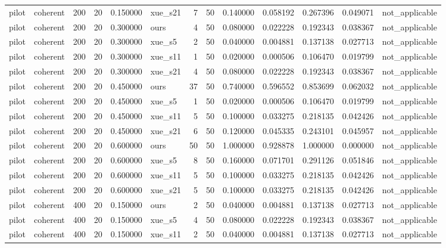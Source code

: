 \begin{longtable}{llrrrlrrrrrrl}
pilot & coherent & 200 & 20 & 0.150000 & xue\_s21 & 7 & 50 & 0.140000 & 0.058192 & 0.267396 & 0.049071 & not\_applicable \\
pilot & coherent & 200 & 20 & 0.300000 & ours & 4 & 50 & 0.080000 & 0.022228 & 0.192343 & 0.038367 & not\_applicable \\
pilot & coherent & 200 & 20 & 0.300000 & xue\_s5 & 2 & 50 & 0.040000 & 0.004881 & 0.137138 & 0.027713 & not\_applicable \\
pilot & coherent & 200 & 20 & 0.300000 & xue\_s11 & 1 & 50 & 0.020000 & 0.000506 & 0.106470 & 0.019799 & not\_applicable \\
pilot & coherent & 200 & 20 & 0.300000 & xue\_s21 & 4 & 50 & 0.080000 & 0.022228 & 0.192343 & 0.038367 & not\_applicable \\
pilot & coherent & 200 & 20 & 0.450000 & ours & 37 & 50 & 0.740000 & 0.596552 & 0.853699 & 0.062032 & not\_applicable \\
pilot & coherent & 200 & 20 & 0.450000 & xue\_s5 & 1 & 50 & 0.020000 & 0.000506 & 0.106470 & 0.019799 & not\_applicable \\
pilot & coherent & 200 & 20 & 0.450000 & xue\_s11 & 5 & 50 & 0.100000 & 0.033275 & 0.218135 & 0.042426 & not\_applicable \\
pilot & coherent & 200 & 20 & 0.450000 & xue\_s21 & 6 & 50 & 0.120000 & 0.045335 & 0.243101 & 0.045957 & not\_applicable \\
pilot & coherent & 200 & 20 & 0.600000 & ours & 50 & 50 & 1.000000 & 0.928878 & 1.000000 & 0.000000 & not\_applicable \\
pilot & coherent & 200 & 20 & 0.600000 & xue\_s5 & 8 & 50 & 0.160000 & 0.071701 & 0.291126 & 0.051846 & not\_applicable \\
pilot & coherent & 200 & 20 & 0.600000 & xue\_s11 & 5 & 50 & 0.100000 & 0.033275 & 0.218135 & 0.042426 & not\_applicable \\
pilot & coherent & 200 & 20 & 0.600000 & xue\_s21 & 5 & 50 & 0.100000 & 0.033275 & 0.218135 & 0.042426 & not\_applicable \\
pilot & coherent & 400 & 20 & 0.150000 & ours & 2 & 50 & 0.040000 & 0.004881 & 0.137138 & 0.027713 & not\_applicable \\
pilot & coherent & 400 & 20 & 0.150000 & xue\_s5 & 4 & 50 & 0.080000 & 0.022228 & 0.192343 & 0.038367 & not\_applicable \\
pilot & coherent & 400 & 20 & 0.150000 & xue\_s11 & 2 & 50 & 0.040000 & 0.004881 & 0.137138 & 0.027713 & not\_applicable \\

\end{longtable}
